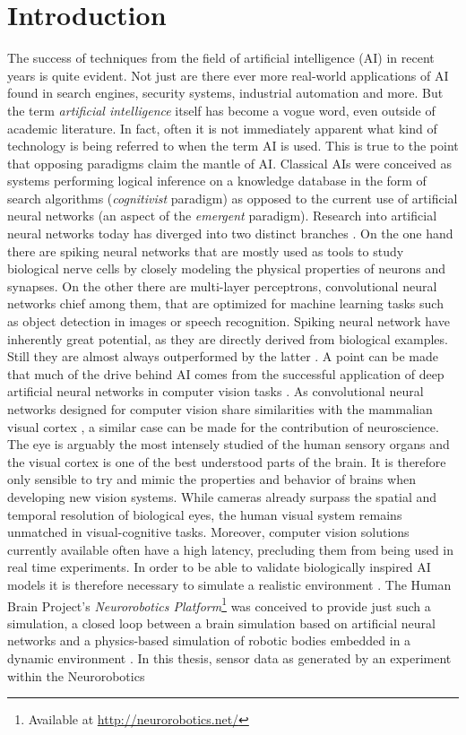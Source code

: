 \chapter{Introduction}\label{chapter:introduction}
The success of techniques from the field of artificial intelligence (AI) in recent years is quite evident. Not just are there ever more real-world applications of AI found in search engines, security systems, industrial automation and more. But the term \emph{artificial intelligence} itself has become a vogue word, even outside of academic literature. In fact, often it is not immediately apparent what kind of technology is being referred to when the term AI is used. This is true to the point that opposing paradigms claim the mantle of AI. Classical AIs were conceived as systems performing logical inference on a knowledge database in the form of search algorithms (\emph{cognitivist} paradigm) as opposed to the current use of artificial neural networks (an aspect of the \emph{emergent} paradigm). Research into artificial neural networks today has diverged into two distinct branches \cite{krichmar2018neurorobotics}. On the one hand there are spiking neural networks that are mostly used as tools to study biological nerve cells by closely modeling the physical properties of neurons and synapses. On the other there are multi-layer perceptrons, convolutional neural networks chief among them, that are optimized for machine learning tasks such as object detection in images or speech recognition. Spiking neural network have inherently great potential, as they are directly derived from biological examples. Still they are almost always outperformed by the latter \cite{rosenblatt1958perceptron,rumelhart1985learning}. A point can be made that much of the drive behind AI comes from the successful application of deep artificial neural networks in computer vision tasks \cite{paulun2018retinotopic}. As convolutional neural networks designed for computer vision share similarities with the mammalian visual cortex \cite{lecun1998gradient}, a similar case can be made for the contribution of neuroscience. The eye is arguably the most intensely studied of the human sensory organs and the visual cortex is one of the best understood parts of the brain. It is therefore only sensible to try and mimic the properties and behavior of brains when developing new vision systems. While cameras already surpass the spatial and temporal resolution of biological eyes, the human visual system remains unmatched in visual-cognitive tasks. Moreover, computer vision solutions currently available often have a high latency, precluding them from being used in real time experiments. In order to be able to validate biologically inspired AI models it is therefore necessary to simulate a realistic environment \cite{falotico2017connecting}. The Human Brain Project's \emph{Neurorobotics Platform}\footnote{Available at \url{http://neurorobotics.net/}} was conceived to provide just such a simulation, a closed loop between a brain simulation based on artificial neural networks and a physics-based simulation of robotic bodies embedded in a dynamic environment \cite{knoll2017neurorobotics}. In this thesis, sensor data as generated by an experiment within the Neurorobotics 